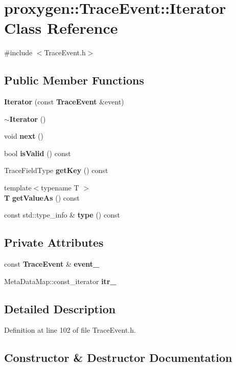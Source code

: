 \section{proxygen\+:\+:Trace\+Event\+:\+:Iterator Class Reference}
\label{classproxygen_1_1TraceEvent_1_1Iterator}


{\ttfamily \#include $<$Trace\+Event.\+h$>$}

\subsection*{Public Member Functions}
\begin{DoxyCompactItemize}
\item 
{\bf Iterator} (const {\bf Trace\+Event} \&event)
\item 
{\bf $\sim$\+Iterator} ()
\item 
void {\bf next} ()
\item 
bool {\bf is\+Valid} () const 
\item 
Trace\+Field\+Type {\bf get\+Key} () const 
\item 
{\footnotesize template$<$typename T $>$ }\\{\bf T} {\bf get\+Value\+As} () const 
\item 
const std\+::type\+\_\+info \& {\bf type} () const 
\end{DoxyCompactItemize}
\subsection*{Private Attributes}
\begin{DoxyCompactItemize}
\item 
const {\bf Trace\+Event} \& {\bf event\+\_\+}
\item 
Meta\+Data\+Map\+::const\+\_\+iterator {\bf itr\+\_\+}
\end{DoxyCompactItemize}


\subsection{Detailed Description}


Definition at line 102 of file Trace\+Event.\+h.



\subsection{Constructor \& Destructor Documentation}
